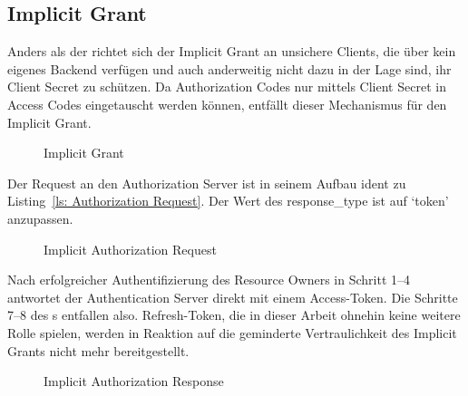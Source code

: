 \subsection{Implicit Grant}\label{ssec:implicit}
Anders als der  richtet sich der Implicit Grant an
unsichere Clients, die über kein eigenes Backend verfügen und auch anderweitig
nicht dazu in der Lage sind, ihr Client Secret zu schützen. Da Authorization
Codes nur mittels Client Secret in Access Codes eingetauscht werden können,
entfällt dieser Mechanismus für den Implicit Grant.

\begin{figure}[h]
    \scalebox{.5} {
        
    }
    \caption{Implicit Grant}\label{fig: Implicit Grant}
\end{figure} \noindent
Der Request an den Authorization Server ist in seinem Aufbau ident zu Listing~\ref{ls: Authorization Request}. Der Wert des response\_type ist auf `token'
anzupassen.

\begin{figure}[h]
    \scalebox{.8}{
        
    }
    \caption{Implicit Authorization Request}\label{ls: Implicit Authorization Request}
\end{figure} \noindent
Nach erfolgreicher Authentifizierung des Resource Owners in Schritt 1--4
antwortet der Authentication Server direkt mit einem Access-Token. Die Schritte
7--8 des s entfallen also.
Refresh-Token, die in dieser Arbeit ohnehin keine weitere Rolle spielen, werden
in Reaktion auf die geminderte Vertraulichkeit des Implicit Grants nicht mehr
bereitgestellt.

\begin{figure}[h]
    \scalebox{.8}{
        
    }
    \caption{Implicit Authorization Response}\label{ls: Implicit Authorization Response}
\end{figure}
